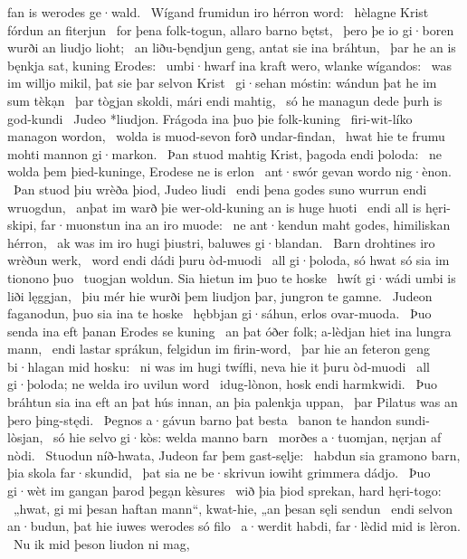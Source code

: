 fan is werodes ge·wald. \hld\ Wígand frumidun
iro hérron word: \hld\ hèlagne Krist
fórdun an fiterjun \hld\ for þena folk-togun,
allaro barno bętst, \hld\ þero þe io gi·boren wurði
an liudjo lioht; \hld\ an liðu-bęndjun geng,
antat sie ina bráhtun, \hld\ þar he an is bęnkja sat,
kuning Erodes: \hld\ umbi·hwarf ina kraft wero,
wlanke wígandos: \hld\ was im willjo mikil,
þat sie þar selvon Krist \hld\ gi·sehan móstin:
wándun þat he im sum tèkạn \hld\ þar tògjan skoldi,
mári endi mahtig, \hld\ só he managun dede
þurh is god-kundi \hld\ Judeo *liudjon.
Frágoda ina þuo þie folk-kuning \hld\ firi-wit-líko
managon wordon, \hld\ wolda is muod-sevon
forð undar-findan, \hld\ hwat hie te frumu mohti
mannon gi·markon. \hld\ Þan stuod mahtig Krist,
þagoda endi þoloda: \hld\ ne wolda þem þied-kuninge,
Erodese ne is erlon \hld\ ant·swór gevan
wordo nig·ènon. \hld\ Þan stuod þiu wrèða þiod,
Judeo liudi \hld\ endi þena godes suno
wurrun endi wruogdun, \hld\ anþat im warð þie wer-old-kuning
an is huge huoti \hld\ endi all is hęri-skipi,
far·muonstun ina an iro muode: \hld\ ne ant·kendun maht godes,
himiliskan hérron, \hld\ ak was im iro hugi þiustri,
baluwes gi·blandan. \hld\ Barn drohtines
iro wrèðun werk, \hld\ word endi dádi
þuru òd-muodi \hld\ all gi·þoloda,
só hwat só sia im tionono þuo \hld\ tuogjan woldun.
Sia hietun im þuo te hoske \hld\ hwít gi·wádi
umbi is liði lęggjan, \hld\ þiu mér hie wurði þem liudjon þar,
jungron te gamne. \hld\ Judeon faganodun,
þuo sia ina te hoske \hld\ hębbjan gi·sáhun,
erlos ovar-muoda. \hld\ Þuo senda ina eft þanan
Erodes se kuning \hld\ an þat óðer folk;
a-lèdjan hiet ina lungra mann, \hld\ endi lastar sprákun,
felgidun im firin-word, \hld\ þar hie an feteron geng
bi·hlagan mid hosku: \hld\ ni was im hugi twífli,
neva hie it þuru òd-muodi \hld\ all gi·þoloda;
ne welda iro uvilun word \hld\ idug-lònon,
hosk endi harmkwidi. \hld\ Þuo bráhtun sia ina eft an þat hús innan,
an þia palenkja uppan, \hld\ þar Pilatus was
an þero þing-stędi. \hld\ Þegnos a·gávun
barno þat besta \hld\ banon te handon
sundi-lòsjan, \hld\ só hie selvo gi·kòs:
welda manno barn \hld\ morðes a·tuomjan,
nęrjan af nòdi. \hld\ Stuodun níð-hwata,
Judeon far þem gast-sęlje: \hld\ habdun sia gramono barn,
þia skola far·skundid, \hld\ þat sia ne be·skrivun iowiht
grimmera dádjo. \hld\ Þuo gi·wèt im gangan þarod
þegạn kèsures \hld\ wið þia þiod sprekan,
hard hęri-togo: \hld\ „hwat, gi mi þesan haftan mann“, kwat-hie,
„an þesan sęli sendun \hld\ endi selvon an·budun,
þat hie iuwes werodes só filo \hld\ a·werdit habdi,
far·lèdid mid is lèron. \hld\ Nu ik mid þeson liudon ni mag,
